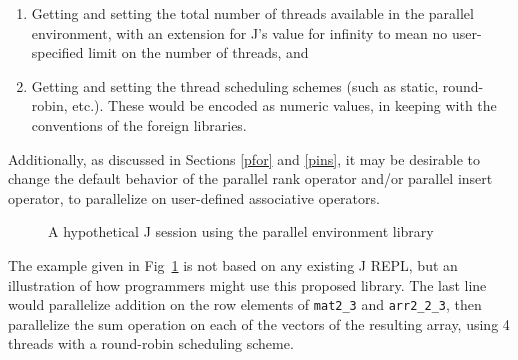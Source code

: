 \begin{enumerate}
    \item Getting and setting the total number of threads available in the parallel environment,
        with an extension for J's value for infinity to mean no user-specified limit on the number of threads, and
    \item Getting and setting the thread scheduling schemes (such as static, round-robin, etc.).
        These would be encoded as numeric values, in keeping with the conventions of the foreign libraries.
\end{enumerate}

\noindent Additionally, as discussed in Sections \ref{pfor} and \ref{pins}, it may be desirable to change 
the default behavior of the parallel rank operator and/or parallel insert operator, 
to parallelize on user-defined associative operators.

\begin{figure}[h]
\begin{quote}
\begin{singlespacing}
\begin{small}
\end{small}
\end{singlespacing}
\end{quote}
\caption{A hypothetical J session using the parallel environment library}
\label{fig::pfor}
\end{figure}

The example given in Fig~\ref{fig::pfor} is not based on any existing J REPL, 
but an illustration of how programmers might use this proposed library.
The last line would parallelize addition on the row elements of \texttt{mat2\_3} and \texttt{arr2\_2\_3},
then parallelize the sum operation on each of the vectors of the resulting array, 
using 4 threads with a round-robin scheduling scheme.
